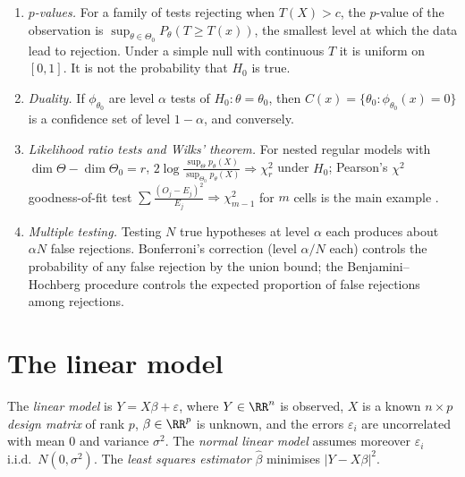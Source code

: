 \begin{remark}\label{statistics:remark-tests}
\begin{enumerate}
\item \emph{$p$-values.} For a family of tests rejecting when $T(X) > c$, the $p$-value of the observation is $\sup_{\theta \in \Theta_0}P_\theta(T \geq T(x))$, the smallest level at which the data lead to rejection. Under a simple null with
continuous $T$ it is uniform on $[0, 1]$. It is not the probability that $H_0$ is true.
\item \emph{Duality.} If $\phi_{\theta_0}$ are level $\alpha$ tests of $H_0 : \theta = \theta_0$, then $C(x) = \{\theta_0 : \phi_{\theta_0}(x) = 0\}$ is a confidence set of level $1 - \alpha$, and conversely.
\item \emph{Likelihood ratio tests and Wilks' theorem.} For nested regular models with $\dim\Theta - \dim\Theta_0 = r$, $2\log\frac{\sup_\Theta p_\theta(X)}{\sup_{\Theta_0}p_\theta(X)} \Rightarrow \chi^2_r$ under $H_0$; Pearson's $\chi^2$ goodness-of-fit test
$\sum\frac{(O_j - E_j)^2}{E_j} \Rightarrow \chi^2_{m-1}$ for $m$ cells is the main example \cite{van-der-vaart}.
\item \emph{Multiple testing.} Testing $N$ true hypotheses at level $\alpha$ each produces about $\alpha N$ false rejections. Bonferroni's correction (level $\alpha/N$ each) controls the probability of any false rejection by the union
bound; the Benjamini--Hochberg procedure controls the expected proportion of false rejections among rejections.
\end{enumerate}
\end{remark}

\section{The linear model}\label{statistics:section-linear-model}

\begin{definition}\label{statistics:definition-linear-model}
The \emph{linear model} is $Y = X\beta + \varepsilon$, where $Y \in \RR^n$ is observed, $X$ is a known $n \times p$ \emph{design matrix} of rank $p$, $\beta \in \RR^p$ is unknown, and the errors $\varepsilon_i$ are uncorrelated with mean $0$ and
variance $\sigma^2$. The \emph{normal linear model} assumes moreover $\varepsilon_i$ i.i.d.\ $N(0, \sigma^2)$. The \emph{least squares estimator} $\hat\beta$ minimises $|Y - X\beta|^2$.
\end{definition}

